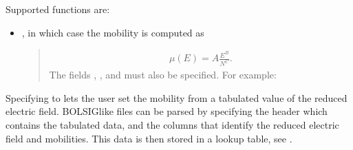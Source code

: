 \documentclass[letterpaper,10pt,english]{sphinxmanual}
\begin{document}
Supported functions are:
\begin{itemize}
\item {} 
, in which case the mobility is computed as
\begin{quote}
\begin{equation*}
\begin{split}\mu(E) = A \frac{E^B}{N^C}.\end{split}
\end{equation*}
The fields , , and  must also be specified.
For example:

\begin{sphinxVerbatim}[commandchars=\\\{\},formatcom=\scriptsize]
  \PYG{p}{[}
            
      
         
        
        
        
        
  \PYG{p}{]}
\end{sphinxVerbatim}
\end{quote}

\end{itemize}


Specifying  to  lets the user set the mobility from a tabulated value of the reduced electric field.
BOLSIG\sphinxhyphen{}like files can be parsed by specifying the header which contains the tabulated data, and the columns that identify the reduced electric field and mobilities.
This data is then stored in a lookup table, see {\hyperref[\detokenize{Utilities/LookupTable:chap-lookuptable}]{}}.
\end{document}
